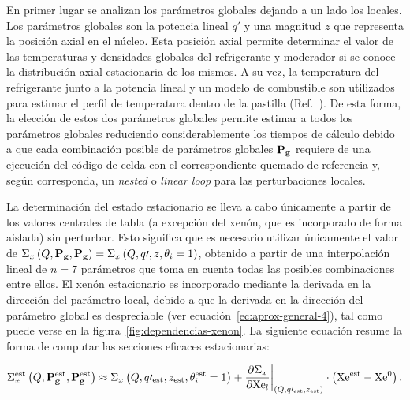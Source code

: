 \documentclass[11pt]{article}
\renewcommand{\vec}[1]{\ensuremath\mathbf{#1}}
\begin{document}
En primer lugar se analizan los parámetros globales dejando a un lado los locales. Los parámetros globales son la potencia lineal $q\prime$ y una magnitud $z$ que representa la posición axial en el núcleo. Esta posición axial permite determinar el valor de las temperaturas y densidades globales del refrigerante y moderador si se conoce la distribución axial estacionaria de los mismos. A su vez, la temperatura del refrigerante junto a la potencia lineal y un modelo de combustible son utilizados para estimar el perfil de temperatura dentro de la pastilla (Ref.~\cite{modelos-pastilla-relap}). De esta forma, la elección de estos dos parámetros globales permite estimar a todos los parámetros globales reduciendo considerablemente los tiempos de cálculo debido a que cada combinación posible de parámetros globales $\vec{P_g}$ requiere de una ejecución del código de celda con el correspondiente quemado de referencia y, según corresponda, un \emph{nested} o \emph{linear loop} para las perturbaciones locales.

La determinación del estado estacionario se lleva a cabo únicamente a partir de los valores centrales de tabla (a excepción del xenón, que es incorporado de forma aislada) sin perturbar. Esto significa que es necesario utilizar únicamente el valor de $\Sigma_x \left( Q, \vec{P_g}, \vec{P_g} \right) = \Sigma_x \left( Q, q\prime, z, \theta_i = \num{1} \right)$, obtenido a partir de una interpolación lineal de $n = \num{7}$ parámetros que toma en cuenta todas las posibles combinaciones entre ellos. El xenón estacionario es incorporado mediante la derivada en la dirección del parámetro local, debido a que la derivada en la dirección del parámetro global es despreciable (ver ecuación~\ref{ec:aprox-general-4}), tal como puede verse en la figura~\ref{fig:dependencias-xenon}. La siguiente ecuación resume la forma de computar las secciones eficaces estacionarias:

\begin{equation} \label{ec:aprox-general-7}
 \Sigma^{\text{est}}_x \left( Q, \vec{P^{\text{est}}_g}, \vec{P^{\text{est}}_g} \right) \approx
 \Sigma_x \left( Q, q\prime_{\text{est}}, z_{\text{est}}, \theta^{\text{est}}_i = \num{1} \right) + 
 \frac{\partial\Sigma_x}{\partial \text{Xe}_l}\bigg|_{\left( Q, q\prime_{\text{est}}, z_{\text{est}} \right)} \cdot \left( \text{Xe}^{\text{est}} - \text{Xe}^0 \right).
\end{equation}
\end{document}
